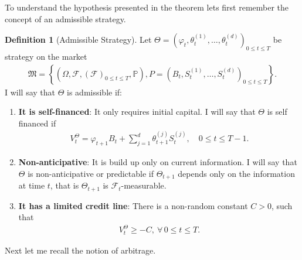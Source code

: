 \documentclass{article}
\theoremstyle{definition}
\newtheorem{definition}[theorem]{Definition}
\numberwithin{equation}{section}
\begin{document}
To understand the hypothesis presented in the theorem lets first remember the concept of an admissible strategy.
\begin{definition}[Admissible Strategy]
    Let $\Theta = \left(\varphi_t, \theta_t^{(1)}, \ldots, \theta_t^{(d)}\right)_{0 \leq t \leq T}$ be strategy on the market
    \begin{align}
        \mathfrak{M} =
        \left\{
            \left(
                \Omega, 
                \mathscr{F}, 
                \left(
                    \mathscr{F}
                \right)_{0 \leq t \leq T},
                \mathbb{P}
            \right),
            P =
            \left(
                B_t,
                S_t^{(1)},
                \ldots,
                S_t^{(d)}
            \right)_{0 \leq t \leq T}
        \right\}.
    \end{align}
    I will say that $\Theta$ is admissible if:
    \begin{enumerate}
        \item \textbf{It is self-financed}: It only requires initial capital.
        I will say that $\Theta$ is self financed if
        \begin{align}
            V_t^{\Theta} = \varphi_{t+1}B_t + \sum_{j=1}^d \theta_{t+1}^{(j)}S_t^{(j)}, \quad 0 \leq t \leq T-1. 
        \end{align}
        \item \textbf{Non-anticipative}: It is build up only on current information.
        I will say that $\Theta$ is non-anticipative or predictable if $\Theta_{t+1}$ depends only on the information at time $t$, that is $\Theta_{t+1}$ is $\mathscr{F}_t$-measurable.
        \item \textbf{It has a limited credit line}: There is a non-random constant $C > 0$, such that
        \begin{align}
            V_t^{\Theta} \geq -C, \ \forall \, 0 \leq t \leq T.
        \end{align}
    \end{enumerate}
\end{definition}
Next let me recall the notion of arbitrage.
\end{document}
